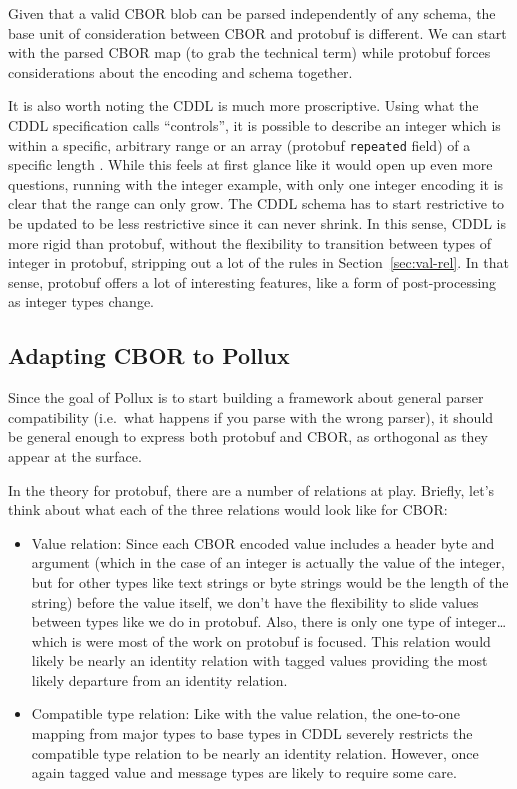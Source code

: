 \documentclass[11pt]{article}
\theoremstyle{definition}
\theoremstyle{plain}
\begin{document}
Given that a valid CBOR blob can be parsed independently of any schema, the base
unit of consideration between CBOR and protobuf is different. We can start with
the parsed CBOR map (to grab the technical term) while protobuf forces
considerations about the encoding and schema together. 

It is also worth noting the CDDL is much more proscriptive. Using what the CDDL
specification calls ``controls'', it is possible to describe an integer which is
within a specific, arbitrary range or an array (protobuf \texttt{repeated}
field) of a specific length \cite{birkholzConciseDataDefinition2019}. While this
feels at first glance like it would open up even more questions, running with
the integer example, with only one integer encoding it is clear that the range
can only grow. The CDDL schema has to start restrictive to be updated to be less
restrictive since it can never shrink. In this sense, CDDL is more rigid than
protobuf, without the flexibility to transition between types of integer in
protobuf, stripping out a lot of the rules in Section~\ref{sec:val-rel}. In that
sense, protobuf offers a lot of interesting features, like a form of
post-processing as integer types change.

\subsection{Adapting CBOR to Pollux}

Since the goal of Pollux is to start building a framework about general parser
compatibility (i.e.\ what happens if you parse with the wrong parser), it should
be general enough to express both protobuf and CBOR, as orthogonal as they
appear at the surface.

In the theory for protobuf, there are a number of relations at play. Briefly,
let's think about what each of the three relations would look like for CBOR:

\begin{itemize}
\item Value relation: Since each CBOR encoded value includes a header byte and
  argument (which in the case of an integer is actually the value of the
  integer, but for other types like text strings or byte strings would be the
  length of the string) before the value itself, we don't have the flexibility
  to slide values between types like we do in protobuf. Also, there is only one
  type of integer\ldots which is were most of the work on protobuf is focused. This
  relation would likely be nearly an identity relation with tagged values
  providing the most likely departure from an identity relation.
\item Compatible type relation: Like with the value relation, the one-to-one
  mapping from major types to base types in CDDL severely restricts the
  compatible type relation to be nearly an identity relation. However, once
  again tagged value and message types are likely to require some care.
\end{itemize}
\end{document}

